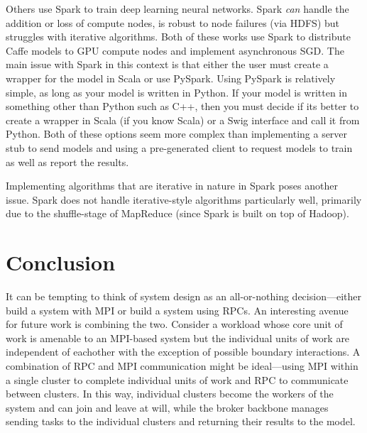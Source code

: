 \documentclass[conference]{IEEEtran}
\begin{document}
Others \cite{journals/corr/MoritzNSJ15, journals/corr/KimPJY16} use Spark
\cite{Zaharia:2016:ASU:3013530.2934664} to
train deep learning neural networks. Spark \emph{can} handle the addition or loss
of compute nodes, is robust to node failures (via HDFS) but struggles with
iterative algorithms. Both of these works use Spark to distribute Caffe
\cite{Jia:2014:CCA:2647868.2654889} models to GPU compute nodes
and implement asynchronous SGD. The main issue with Spark in this context
is that either the user must create a wrapper for the model in Scala or
use PySpark. Using PySpark is relatively simple, as long as your model is
written in Python. If your model is written in something other than Python
such as C++, then you must decide if its better to create a wrapper in Scala
(if you know Scala) or a Swig interface and call it from Python. Both of
these options seem more complex than implementing a server stub to send
models and using a pre-generated client to request models to train as well
as report the results.

Implementing algorithms that are iterative in nature in Spark poses another
issue. Spark does not handle iterative-style algorithms particularly well,
primarily due to the shuffle-stage of MapReduce (since Spark is built on
top of Hadoop).

\section{Conclusion}
It can be tempting to think of system design as an all-or-nothing
decision---either build a system with MPI or build a system using RPCs. An
interesting avenue for future work is combining the two. Consider a workload
whose core unit of work is amenable to an MPI-based system but the individual
units of work are independent of eachother with the exception of possible
boundary interactions. A combination of RPC and MPI communication might be
ideal---using MPI within a single cluster to complete individual units of work
and RPC to communicate between clusters. In this way, individual clusters become
the workers of the system and can join and leave at will, while the broker
backbone manages sending tasks to the individual clusters and returning their
results to the model.
\balance


\end{document}
